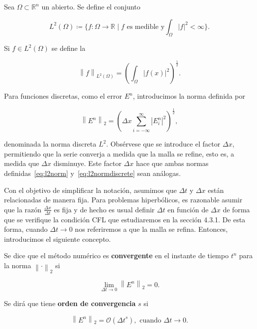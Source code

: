 \begin{definition}
  Sea $\Omega\subset\mathbb{R}^{n}$ un abierto.
  Se define el conjunto

  \begin{equation*}
    L^{2}\left(\Omega\right)\coloneqq
    \big\{
    f\colon\Omega\to\mathbb{R}\mid
    f\text{ es medible y}
    \int_{\Omega}\left|f\right|^{2}<\infty
    \big\}.
  \end{equation*}

  Si $f\in L^{2}\left(\Omega\right)$ se define la

  \begin{equation}\label{eq:l2norm}
    {\left\|f\right\|}_{L^{2}\left(\Omega\right)}=
      {\left(
        \int_{\Omega}
        \left|f\left(x\right)\right|^{2}
        \right)}^{\frac{1}{2}}.
  \end{equation}
\end{definition}

Para funciones discretas, como el error $E^{n}$, introducimos la
norma definida por

\begin{equation}\label{eq:l2normdiscrete}
  {\left\|E^{n}\right\|}_{2}=
    {
      \left(
      \Delta x
      \sum_{i=-\infty}^{\infty}
      {\left|E^{n}_{i}\right|}^{2}
      \right)
    }^{\frac{1}{2}},
\end{equation}

denominada la norma discreta $L^{2}$.
Obsérvese que se introduce el factor $\Delta x$, permitiendo que la
serie converja a medida que la malla se refine, esto es, a medida que
$\Delta x$ disminuye.
Este factor $\Delta x$ hace que ambas normas
definidas~\eqref{eq:l2norm} y~\eqref{eq:l2normdiscrete} sean
análogas.

Con el objetivo de simplificar la notación, asumimos que $\Delta t$ y
$\Delta x$ están relacionadas de manera fija.
Para problemas hiperbólicos, es razonable asumir que la razón
\begin{math}
  \frac{\Delta x}{\Delta t}
\end{math}
es fija y de hecho es usual definir $\Delta t$ en función de
$\Delta x$ de forma que se verifique la condición CFL que
estudiaremos en la sección 4.3.1.
De esta forma, cuando $\Delta t\to 0$ nos referiremos a que la malla
se refina.
Entonces, introducimos el siguiente concepto.

\begin{definition}
  Se dice que el método numérico es \textbf{convergente} en el
  instante de tiempo $t^{n}$ para la norma
  ${\left\|\cdot\right\|}_{2}$ si

  \begin{equation*}
    \lim_{\Delta t\to0}
    {\left\|E^{n}\right\|}_{2}=
    0.
  \end{equation*}

  Se dirá que tiene \textbf{orden de convergencia} $s$ si

  \begin{equation*}
    \left\|
    E^{n}
    \right\|_{2}=
    \mathcal{O}
    \left({\Delta t}^{s}\right),
    \text{ cuando }
    \Delta t\to 0.
  \end{equation*}
\end{definition}

